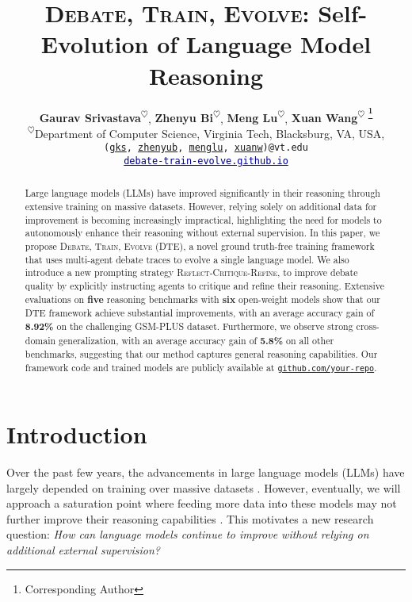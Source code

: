 \documentclass[11pt]{article}
\title{\textsc{Debate, Train, Evolve:} Self-Evolution of Language Model Reasoning}
\author{
 \textbf{Gaurav Srivastava\textsuperscript{$\heartsuit$}},
 \textbf{Zhenyu Bi\textsuperscript{$\heartsuit$}},
 \textbf{Meng Lu\textsuperscript{$\heartsuit$}},
 \textbf{Xuan Wang\textsuperscript{$\heartsuit$ \thanks{Corresponding Author}}}
\\
 \textsuperscript{$\heartsuit$}Department of Computer Science, Virginia Tech, Blacksburg, VA, USA,
\\
 \normalsize{
        \texttt{(\href{gks@vt.edu}{gks}, \href{zhenyub@vt.edu}{zhenyub}, \href{menglu@vt.edu}{menglu}, \href{xuanw@vt.edu}{xuanw})@vt.edu}
 }
 \\
 \normalsize{
   \href{https://your-project-page.com}{\textcolor{darkblue}{\texttt{debate-train-evolve.github.io}}}
}
}
\begin{document}
\maketitle






\begin{abstract}
Large language models (LLMs) have improved significantly in their reasoning through extensive training on massive datasets. However, relying solely on additional data for improvement is becoming increasingly impractical, highlighting the need for models to autonomously enhance their reasoning without external supervision. In this paper, we propose \textsc{Debate, Train, Evolve (DTE)}, a novel ground truth-free training framework that uses multi-agent debate traces to evolve a single language model. We also introduce a new prompting strategy \textsc{Reflect-Critique-Refine}, to improve debate quality by explicitly instructing agents to critique and refine their reasoning. Extensive evaluations on \textbf{five} reasoning benchmarks with \textbf{six} open-weight models show that our DTE framework achieve substantial improvements, with an average accuracy gain of \textbf{8.92\%} on the challenging GSM-PLUS dataset. Furthermore, we observe strong cross-domain generalization, with an average accuracy gain of \textbf{5.8\%} on all other benchmarks, suggesting that our method captures general reasoning capabilities. Our framework code and trained models are publicly available at \href{https://github.com/your-repo}{\texttt{github.com/your-repo}}.
\end{abstract}





\section{Introduction}

Over the past few years, the advancements in large language models (LLMs) have largely depended on training over massive datasets \cite{abdin2024phi, abdin2025phi}. However, eventually, we will approach a saturation point where feeding more data into these models may not further improve their reasoning capabilities \cite{costello2025think}. This motivates a new research question: \emph{How can language models continue to improve without relying on additional external supervision?} 
\end{document}
